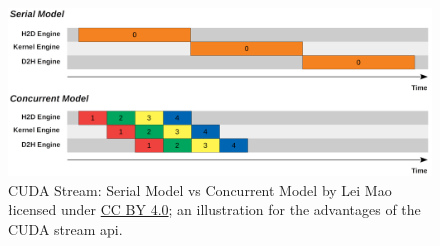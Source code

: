 \begin{figure}
    \centering
    \includegraphics[width=1.\textwidth]{img/cuda-stream.png}
    \caption[CUDA strean illustration]{CUDA Stream: Serial Model vs Concurrent Model by Lei Mao łicensed under \href{https://creativecommons.org/licenses/by/4.0/}{CC BY 4.0}; an illustration for the advantages of the CUDA stream api.}
    \label{fig:cuda-stream}
\end{figure}

